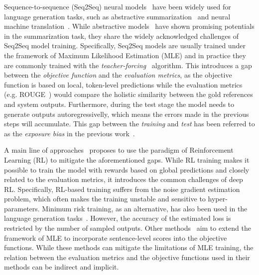 \documentclass[11pt,a4paper]{article}
\begin{document}
Sequence-to-sequence (Seq2Seq) neural models~\citep{10.5555/2969033.2969173} have been widely used for language generation tasks, such as abstractive summarization~\citep{nallapati-etal-2016-abstractive} and neural machine translation~\citep{DBLP:journals/corr/WuSCLNMKCGMKSJL16}. 
While abstractive models~\citep{lewis-etal-2020-bart, zhang2020pegasus} have shown promising potentials in the summarization task, they share the widely acknowledged challenges of Seq2Seq model training. 
Specifically, Seq2Seq models are usually trained under the framework of Maximum Likelihood Estimation (MLE) and in practice they are commonly trained with the \textit{teacher-forcing}~\citep{10.1162/neco.1989.1.2.270} algorithm. 
This introduces a gap between the \textit{objective function} and the \textit{evaluation metrics}, as the objective function is based on local, token-level predictions while the evaluation metrics (e.g. ROUGE~\citep{lin-2004-rouge}) would compare the holistic similarity between the gold references and system outputs.
Furthermore, during the test stage the model needs to generate outputs autoregressivelly, which means the errors made in the previous steps will accumulate. 
This gap between the \textit{training} and \textit{test} has been referred to as the \textit{exposure bias} in the previous work~\citep{10.5555/2969239.2969370, DBLP:journals/corr/RanzatoCAZ15}.

A main line of approaches~\citep{paulus2018a, li-etal-2019-deep} proposes to use the paradigm of Reinforcement Learning (RL) to mitigate the aforementioned gaps.
While RL training makes it possible to train the model with rewards based on global predictions and closely related to the evaluation metrics, it introduces the common challenges of deep RL. 
Specifically, RL-based training suffers from the noise gradient estimation~\citep{greensmith2004variance} problem, which often makes the training unstable and sensitive to hyper-parameters.
Minimum risk training, as an alternative, has also been used in the language generation tasks~\citep{shen-etal-2016-minimum, wieting-etal-2019-beyond}. However, the accuracy of the estimated loss is restricted by the number of sampled outputs.
Other methods~\citep{wiseman-rush-2016-sequence, NIPS2016_2f885d0f, edunov-etal-2018-classical} aim to extend the framework of MLE to incorporate sentence-level scores into the objective functions. 
While these methods can mitigate the limitations of MLE training, the relation between the evaluation metrics and the objective functions used in their methods can be indirect and implicit. 
\end{document}

